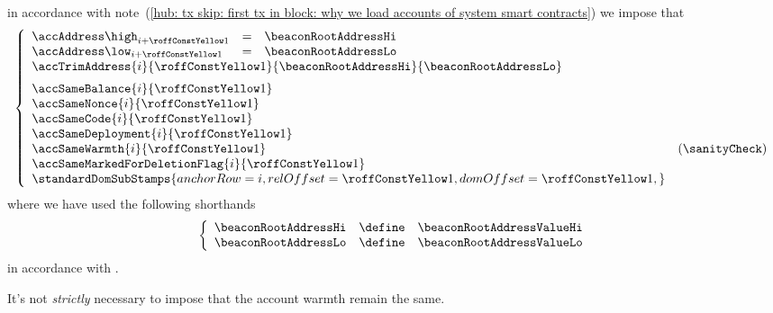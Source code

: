 \item[\underline{\underline{Loading the \inst{BEACONROOT} system smart contract:}}] 
	in accordance with
	note~(\ref{hub: tx skip: first tx in block: why we load accounts of system smart contracts})
	we impose that
	\[
		\left\{ \begin{array}{lclr}
			\accAddress  \high _{i + \roffTxSkipSysiBeaconRootSystemContractAccount} & = & \beaconRootAddressHi \\
			\accAddress  \low  _{i + \roffTxSkipSysiBeaconRootSystemContractAccount} & = & \beaconRootAddressLo \\
			\multicolumn{4}{l}{
				\accTrimAddress
				{i}{\roffTxSkipSysiBeaconRootSystemContractAccount}
				{\beaconRootAddressHi}
				{\beaconRootAddressLo}} \vspace{2mm} \\
			\multicolumn{3}{l}{\accSameBalance                       {i}{\roffTxSkipSysiBeaconRootSystemContractAccount}} \\
			\multicolumn{3}{l}{\accSameNonce                         {i}{\roffTxSkipSysiBeaconRootSystemContractAccount}} \\
			\multicolumn{3}{l}{\accSameCode                          {i}{\roffTxSkipSysiBeaconRootSystemContractAccount}} \\
			\multicolumn{3}{l}{\accSameDeployment                    {i}{\roffTxSkipSysiBeaconRootSystemContractAccount}} \\
			\multicolumn{3}{l}{\accSameWarmth                        {i}{\roffTxSkipSysiBeaconRootSystemContractAccount}} & (\sanityCheck) \\
			\multicolumn{3}{l}{\accSameMarkedForDeletionFlag         {i}{\roffTxSkipSysiBeaconRootSystemContractAccount}} \\
			\multicolumn{3}{l}{
				\standardDomSubStamps {
					anchorRow = i                                              ,
					relOffset = \roffTxSkipSysiBeaconRootSystemContractAccount ,
					domOffset = \roffTxSkipSysiBeaconRootSystemContractAccount ,
				}
			} \\
		\end{array} \right.
	\]
	where we have used the following shorthands
	\[
		\left\{ \begin{array}{lcl}
			\beaconRootAddressHi & \define & \beaconRootAddressValueHi \\
			\beaconRootAddressLo & \define & \beaconRootAddressValueLo \\
		\end{array} \right.
	\]
	in accordance with \cite{EIP-4788}.

	\saNote{} \label{hub: tx skip: sysi: eip 4788: transaction processing: account warmth constancy not strictly necessary}
	It's not \emph{strictly} necessary to impose that the account warmth remain the same.
